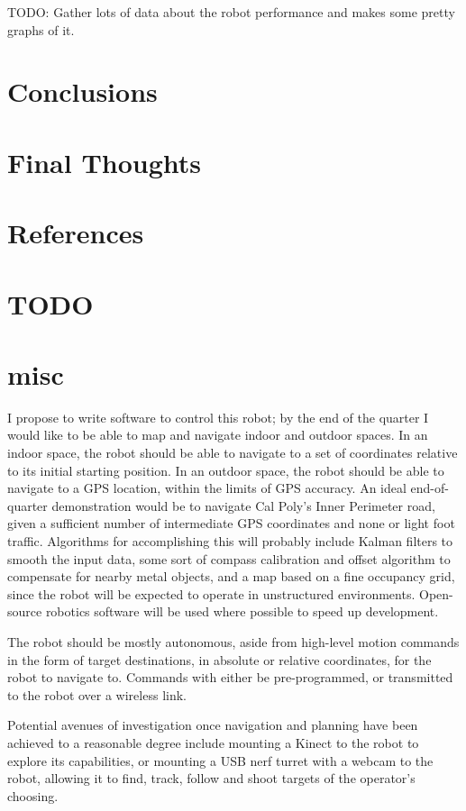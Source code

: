 \documentclass[a4paper,12pt]{article}
\begin{document}
TODO: Gather lots of data about the robot performance and makes some pretty graphs of it.

\section{Conclusions}

\section{Final Thoughts}


\section{References}


\section{TODO}


\section{misc}
I propose to write software to control this robot; by the end of the quarter I would like to be able to map and navigate indoor and outdoor spaces. In an indoor space, the robot should be able to navigate to a set of coordinates relative to its initial starting position. In an outdoor space, the robot should be able to navigate to a GPS location, within the limits of GPS accuracy. An ideal end-of-quarter demonstration would be to navigate Cal Poly's Inner Perimeter road, given a sufficient number of intermediate GPS coordinates and none or light foot traffic. Algorithms for accomplishing this will probably include Kalman filters to smooth the input data, some sort of compass calibration and offset algorithm to compensate for nearby metal objects, and a map based on a fine occupancy grid, since the robot will be expected to operate in unstructured environments. Open-source robotics software will be used where possible to speed up development. 

The robot should be mostly autonomous, aside from high-level motion commands in the form of target destinations, in absolute or relative coordinates, for the robot to navigate to. Commands with either be pre-programmed, or transmitted to the robot over a wireless link.

Potential avenues of investigation once navigation and planning have been achieved to a reasonable degree include mounting a Kinect to the robot to explore its capabilities, or mounting a USB nerf turret with a webcam to the robot, allowing it to find, track, follow and shoot targets of the operator's choosing.
\end{document}
